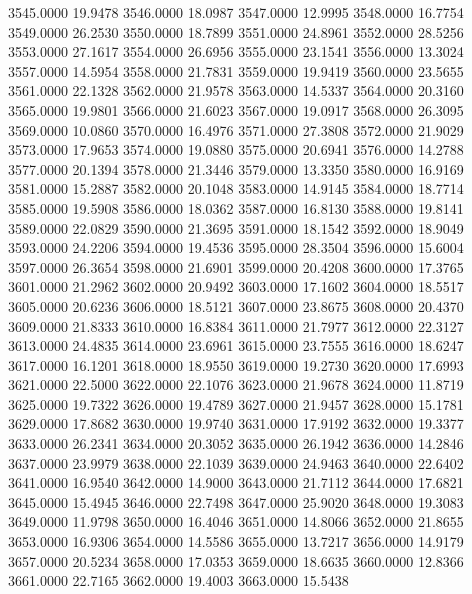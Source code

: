 3545.0000     19.9478
3546.0000     18.0987
3547.0000     12.9995
3548.0000     16.7754
3549.0000     26.2530
3550.0000     18.7899
3551.0000     24.8961
3552.0000     28.5256
3553.0000     27.1617
3554.0000     26.6956
3555.0000     23.1541
3556.0000     13.3024
3557.0000     14.5954
3558.0000     21.7831
3559.0000     19.9419
3560.0000     23.5655
3561.0000     22.1328
3562.0000     21.9578
3563.0000     14.5337
3564.0000     20.3160
3565.0000     19.9801
3566.0000     21.6023
3567.0000     19.0917
3568.0000     26.3095
3569.0000     10.0860
3570.0000     16.4976
3571.0000     27.3808
3572.0000     21.9029
3573.0000     17.9653
3574.0000     19.0880
3575.0000     20.6941
3576.0000     14.2788
3577.0000     20.1394
3578.0000     21.3446
3579.0000     13.3350
3580.0000     16.9169
3581.0000     15.2887
3582.0000     20.1048
3583.0000     14.9145
3584.0000     18.7714
3585.0000     19.5908
3586.0000     18.0362
3587.0000     16.8130
3588.0000     19.8141
3589.0000     22.0829
3590.0000     21.3695
3591.0000     18.1542
3592.0000     18.9049
3593.0000     24.2206
3594.0000     19.4536
3595.0000     28.3504
3596.0000     15.6004
3597.0000     26.3654
3598.0000     21.6901
3599.0000     20.4208
3600.0000     17.3765
3601.0000     21.2962
3602.0000     20.9492
3603.0000     17.1602
3604.0000     18.5517
3605.0000     20.6236
3606.0000     18.5121
3607.0000     23.8675
3608.0000     20.4370
3609.0000     21.8333
3610.0000     16.8384
3611.0000     21.7977
3612.0000     22.3127
3613.0000     24.4835
3614.0000     23.6961
3615.0000     23.7555
3616.0000     18.6247
3617.0000     16.1201
3618.0000     18.9550
3619.0000     19.2730
3620.0000     17.6993
3621.0000     22.5000
3622.0000     22.1076
3623.0000     21.9678
3624.0000     11.8719
3625.0000     19.7322
3626.0000     19.4789
3627.0000     21.9457
3628.0000     15.1781
3629.0000     17.8682
3630.0000     19.9740
3631.0000     17.9192
3632.0000     19.3377
3633.0000     26.2341
3634.0000     20.3052
3635.0000     26.1942
3636.0000     14.2846
3637.0000     23.9979
3638.0000     22.1039
3639.0000     24.9463
3640.0000     22.6402
3641.0000     16.9540
3642.0000     14.9000
3643.0000     21.7112
3644.0000     17.6821
3645.0000     15.4945
3646.0000     22.7498
3647.0000     25.9020
3648.0000     19.3083
3649.0000     11.9798
3650.0000     16.4046
3651.0000     14.8066
3652.0000     21.8655
3653.0000     16.9306
3654.0000     14.5586
3655.0000     13.7217
3656.0000     14.9179
3657.0000     20.5234
3658.0000     17.0353
3659.0000     18.6635
3660.0000     12.8366
3661.0000     22.7165
3662.0000     19.4003
3663.0000     15.5438
